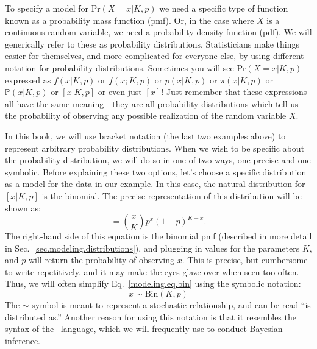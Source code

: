 To specify a model for $\text{Pr}(X=x|K,p)$ we need a specific type of
function known as a probability mass function (pmf). Or, in the case
where $X$ is a continuous random variable, we need a probability density function
(pdf). We will generically refer to these as probability distributions.
Statisticians make things easier for themselves,
and more complicated for everyone else, by using different notation
for probability distributions. Sometimes you will see
$\text{Pr}(X=x|K,p)$ expressed as $f(x|K,p)$ or $f(x; K,p)$ or
$p(x|K,p)$ or $\pi(x|K,p)$ or $\mathbb{P}(x|K,p)$ or $[x|K,p]$ or even
just $[x]$! Just remember that these expressions all have the same
meaning---they are all probability distributions which tell us the
probability of observing any possible realization of the random
variable $X$.

In this book, we will use bracket notation (the last two
examples above) to represent arbitrary probability distributions. When
we wish to be specific about the probability distribution, we will do
so in one of two ways, one precise and one symbolic. Before explaining
these two options, let's choose a specific distribution as a model for
the data in our example. In this case, the natural distribution for
$[x|K,p]$ is the binomial. The precise representation of this
distribution will be shown as:
\begin{equation}
  [x|K,p] = %
             \binom{x}{K}p^x(1-p)^{K-x}.
  \label{modeling.eq.bin}
\end{equation}
The right-hand side of this equation is the binomial pmf (described in
more detail in Sec.~\ref{sec.modeling.distributions}), and plugging in
values for the parameters $K$, and $p$ will return the probability of
observing $x$. This is precise, but cumbersome to write repetitively,
and it may make the eyes glaze over when seen too often. Thus, we will
often simplify Eq.~\ref{modeling.eq.bin} using the symbolic notation:
\begin{equation}
  x \sim \text{Bin}(K, p)
  \label{modeling.eq.binsym}
\end{equation}
The $\sim$ symbol is meant to represent a stochastic relationship, and
can be read ``is distributed as.''
Another reason for using this notation is that
it resembles the syntax of the \bugs~language, which we will
frequently use to conduct Bayesian inference.

